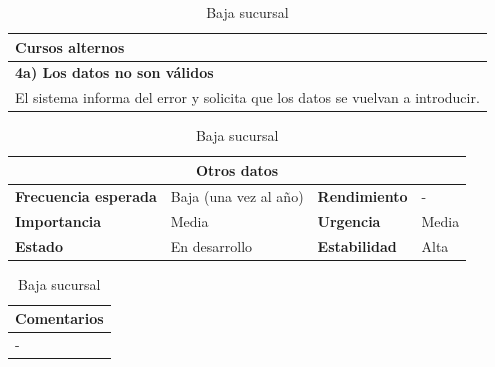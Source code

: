 \documentclass[12pt,spanish]{article}
\begin{document}
\begin{table}[H]
\vspace{1cm}

\begin{tabular}{|m{10pt}|m{7.15cm}|m{10pt}|m{7.15cm}|}
\hline
\multicolumn{4}{|m{16.2cm}|}{\textbf{Cursos alternos}} \\
\hline
\multicolumn{4}{|m{16.2cm}|}{\textbf{4a) Los datos no son válidos}} \\
\hline
\multicolumn{4}{|m{16.2cm}|}{El sistema informa del error y solicita que los datos se vuelvan a introducir.} \\
\hline
\end{tabular}

\vspace{1cm}

\begin{tabular}{|m{3.72cm}|m{3.72cm}|m{3.72cm}|m{3.72cm}|}
\hline
\multicolumn{4}{|c|}{\textbf{Otros datos}} \\
\hline
\textbf{Frecuencia esperada} & Baja (una vez al año) & \textbf{Rendimiento} & - \\
\hline
\textbf{Importancia} & Media & \textbf{Urgencia} & Media \\
\hline
\textbf{Estado} & En desarrollo & \textbf{Estabilidad} & Alta \\
\hline
\end{tabular}

\vspace{1cm}

\begin{tabular}{|m{16.2cm}|}
\hline
\textbf{Comentarios} \\
\hline
- \\
\hline
\end{tabular}

\caption{Baja sucursal}

\end{table}

\end{document}
